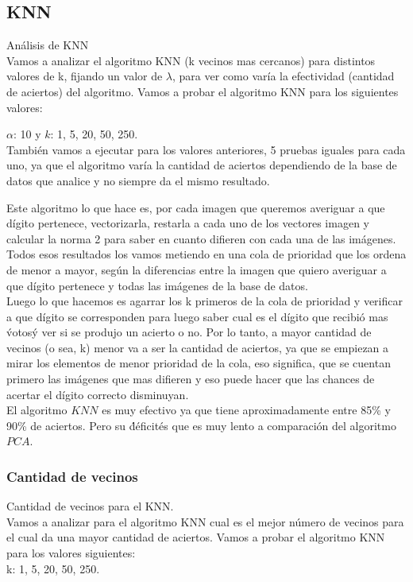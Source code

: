 \subsection{KNN}
Análisis de KNN
\\
Vamos a analizar el algoritmo KNN (k vecinos mas cercanos) para distintos valores de k, fijando un valor de $\lambda$, para ver como varía la efectividad (cantidad de aciertos) del algoritmo.
Vamos a probar el algoritmo KNN para los siguientes valores:

$\alpha$: 10  y $k$: 1, 5, 20, 50, 250.\\

También vamos a ejecutar para los valores anteriores, 5 pruebas iguales para cada uno, ya que el algoritmo varía la cantidad de aciertos dependiendo de la base de datos que analice y no siempre da el mismo resultado.

Este algoritmo lo que hace es, por cada imagen que queremos averiguar a que dígito pertenece, vectorizarla, restarla a cada uno de los vectores imagen y calcular la norma 2 para saber en cuanto difieren con cada una de las imágenes.
Todos esos resultados los vamos metiendo en una cola de prioridad que los ordena de menor a mayor, según la diferencias entre la imagen que quiero averiguar a que dígito pertenece y todas las imágenes de la base de datos.
\\
Luego lo que hacemos es agarrar los k primeros de la cola de prioridad y verificar a que dígito se corresponden para luego saber cual es el dígito que recibió mas \'votos\' y ver si se produjo un acierto o no.
Por lo tanto, a mayor cantidad de vecinos (o sea, k) menor va a ser la cantidad de aciertos, ya que se empiezan a mirar los elementos de menor prioridad de la cola, eso significa, que se cuentan primero las imágenes que mas difieren y eso puede hacer que las chances de acertar el dígito correcto disminuyan.
\\
El algoritmo $KNN$ es muy efectivo ya que tiene aproximadamente entre 85\% y 90\% de aciertos. Pero su \'déficit\' es que es muy lento a comparación del algoritmo $PCA$. 

\subsubsection{Cantidad de vecinos}
Cantidad de vecinos para el KNN.\\ 
Vamos a analizar para el algoritmo KNN cual es el mejor número de vecinos para el cual da una mayor cantidad de aciertos.
Vamos a probar el algoritmo KNN para los valores siguientes:\\
k: 1, 5, 20, 50, 250.\\


